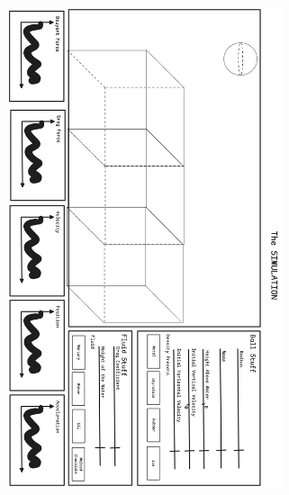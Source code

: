\documentclass{article}
\begin{document}
\begin{figure}[H]
    \centering
    \includegraphics[width=0.72\textwidth]{figures/SIM.png}
\end{figure}
\end{document}
